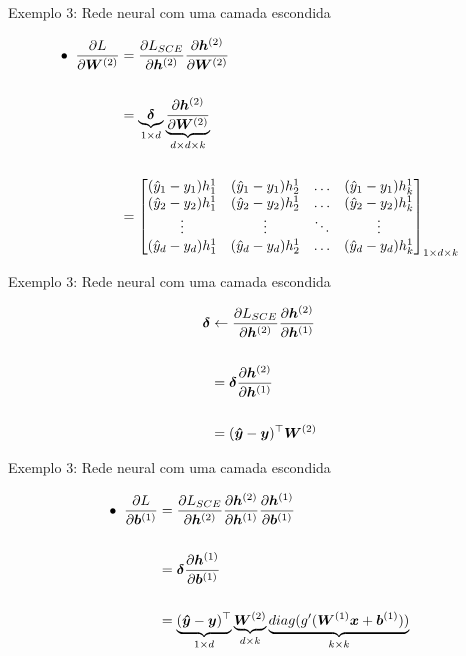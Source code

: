 \documentclass[10pt]{beamer}
\begin{document}
\begin{frame}{Exemplo 3: Rede neural com uma camada escondida}
\large{

\begin{align*}
\bullet \; \; \frac{\partial L}{\partial \bm{W}^{(2)}}&= \frac{\partial L_{SCE}}{\partial \bm{h}^{(2)}}\frac{\partial \bm{h}^{(2)}}{\partial \bm{W}^{(2)}}\\
&\\
&= \underbrace{\bm{\delta}}_{\tiny{1 \times d}}\underbrace{\frac{\partial \bm{h}^{(2)}}{\partial \bm{W}^{(2)}}}_{\tiny{d \times d \times k}}\\
&\\
&= \begin{bmatrix} (\hat{y}_1 - y_1)h^{1}_1 & (\hat{y}_1 - y_1)h^{1}_2 & \dots & (\hat{y}_1 - y_1)h^{1}_k\\
(\hat{y}_2 - y_2)h^{1}_1 & (\hat{y}_2 - y_2)h^{1}_2 & \dots & (\hat{y}_2 - y_2)h^{1}_k\\
\vdots & \vdots & \ddots & \vdots\\ 
(\hat{y}_d - y_d)h^{1}_1 & (\hat{y}_d - y_d)h^{1}_2 & \dots & (\hat{y}_d - y_d)h^{1}_k\\\end{bmatrix}_{\tiny{1 \times d \times k}}\\
\end{align*}
}
\end{frame}

\begin{frame}{Exemplo 3: Rede neural com uma camada escondida}
\Large{

\begin{align*}
\bm{\delta}&\leftarrow \frac{\partial L_{SCE}}{\partial \bm{h}^{(2)}}\frac{\partial \bm{h}^{(2)}}{\partial \bm{h}^{(1)}}\\
&\\
&= \bm{\delta}\frac{\partial \bm{h}^{(2)}}{\partial \bm{h}^{(1)}}\\
&\\
&= (\bm{\hat{y}} - \bm{y})^{\top} \bm{W}^{(2)}\\
\end{align*}
}
\end{frame}

\begin{frame}{Exemplo 3: Rede neural com uma camada escondida}
\Large{

\begin{align*}
\bullet \; \; \frac{\partial L}{\partial \bm{b}^{(1)}}&= \frac{\partial L_{SCE}}{\partial \bm{h}^{(2)}}\frac{\partial \bm{h}^{(2)}}{\partial \bm{h}^{(1)}}\frac{\partial \bm{h}^{(1)}}{\partial \bm{b}^{(1)}}\\
&\\
&= \bm{\delta}\frac{\partial \bm{h}^{(1)}}{\partial \bm{b}^{(1)}}\\
&\\
&= \underbrace{(\bm{\hat{y}} - \bm{y})^{\top}}_{\tiny{1 \times d}} \underbrace{\bm{W}^{(2)}}_{\tiny{d \times k}} \underbrace{diag(g^{\prime}(\bm{W}^{(1)}\bm{x} + \bm{b}^{(1)}))}_{\tiny{k \times k}}\\
\end{align*}
}
\end{frame}
\end{document}
